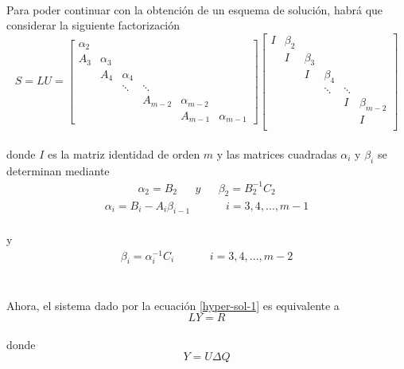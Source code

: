 \documentclass[letterpaper, openright, 12pt]{book}
\begin{document}
    \paragraph*{}
        Para poder continuar con la obtención de un esquema de solución, habrá
        que considerar la siguiente factorización
        \begin{equation}
            S = LU = \begin{bmatrix}
            \alpha_2\\
            A_3 & \alpha_3 \\
            & A_4 & \alpha_4\\
            & & \ddots & \ddots\\
            & & & A_{m-2} & \alpha_{m-2}\\
            & & & & A_{m-1} & \alpha_{m-1}
            \end{bmatrix}
            \begin{bmatrix}
            I & \beta_2\\
            & I & \beta_3\\
            & & I & \beta_4\\
            & & & \ddots & \ddots\\
            & & & & I & \beta_{m-2}\\
            & & & & & I\\
            \end{bmatrix}
        \end{equation}\\
        donde $I$ es la matriz identidad de orden $m$ y las matrices cuadradas
        $\alpha_i$ y $\beta_i$ se determinan mediante
        \begin{align}
            \alpha_2 = B_2 && y && \beta_2 = B_{2}^{-1} C_2
        \end{align}
        \begin{align}
            \alpha_i = B_i - A_i \beta_{i-1} &&&& i = 3, 4, \dots, m-1
        \end{align}\\
        y
        \begin{align}
            \beta_i = \alpha_{i}^{-1} C_i &&&& i = 3, 4, \dots, m-2
        \end{align}\\
    \paragraph*{}
        Ahora, el sistema dado por la ecuación \ref{hyper-sol-1} es equivalente a
        \begin{equation}
            LY = R
            \label{hyper-sol-2}
        \end{equation}\\
        donde
        \begin{equation}
            Y = U \Delta Q
            \label{hyper-sol-3}
        \end{equation}
\end{document}
